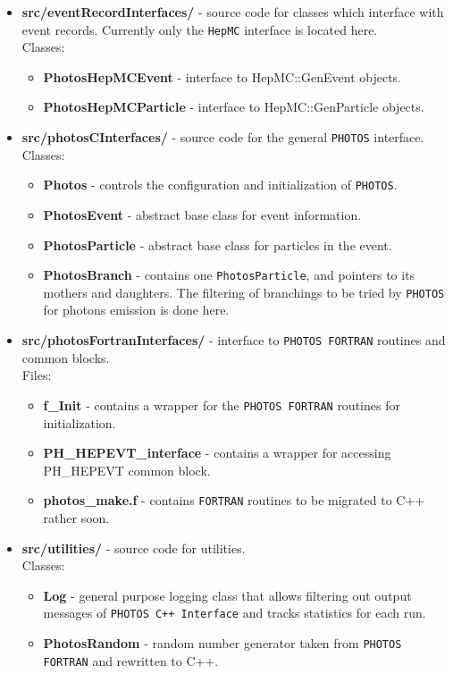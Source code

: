 \documentclass[]{Photos_interface_design}
\begin{document}
\begin{itemize}
\item {\bf src/eventRecordInterfaces/ } - source code for classes which interface with event records.
      Currently only the {\tt HepMC} interface is located here.\\
  Classes:
  \begin{itemize}
  \item { \bf PhotosHepMCEvent} - interface to HepMC::GenEvent objects. 
  \item { \bf PhotosHepMCParticle} - interface to HepMC::GenParticle objects. 
  \end{itemize}   

\item {\bf src/photosCInterfaces/ } - source code for the general {\tt PHOTOS} interface.  \\
  Classes:
  \begin{itemize}
  \item { \bf Photos } - controls the configuration and initialization of {\tt PHOTOS}.
  \item { \bf PhotosEvent } - abstract base class for event information.
  \item { \bf PhotosParticle } - abstract base class for particles in the event.
  \item { \bf PhotosBranch } - contains one {\tt PhotosParticle}, and  pointers to its mothers and daughters.
  The filtering of branchings to be tried by {\tt PHOTOS} for photons emission is done here.
  \end{itemize}

\item {\bf src/photosFortranInterfaces/ } -  interface to {\tt PHOTOS FORTRAN} routines and common blocks. \\
  Files:
    \begin{itemize}
    \item { \bf f\_Init } - contains a wrapper for the {\tt PHOTOS FORTRAN} routines for initialization.
    \item { \bf PH\_HEPEVT\_interface } - contains a wrapper for accessing PH\_HEPEVT common block.
    \item { \bf photos\_make.f } - contains  {\tt FORTRAN} routines to be  migrated to C++ rather soon.
    \end{itemize}

\item {\bf src/utilities/ } - source code for utilities.\\
  Classes:
  \begin{itemize}
  \item { \bf Log} - general purpose logging class that allows filtering out output messages 
      of {\tt PHOTOS C++ Interface} and tracks statistics for each run.
  \item { \bf PhotosRandom} - random number generator taken from {\tt PHOTOS FORTRAN} and rewritten to C++.
  \end{itemize}   


\end{itemize}
\end{document}
